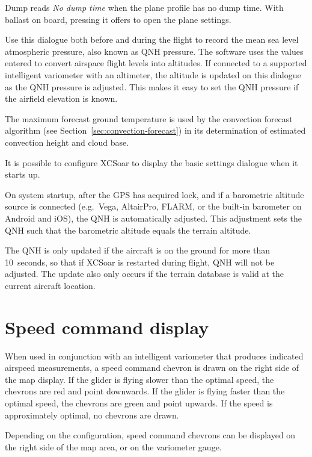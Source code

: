 Dump reads \emph{No dump time} when the plane profile has no dump
time. With ballast on board, pressing it offers to open the plane
settings.

Use this dialogue both before and during the flight to record the mean
sea level atmospheric pressure, also known as QNH pressure.  The
software uses the values entered to convert airspace flight levels
into altitudes.  If connected to a supported intelligent variometer
with an altimeter, the altitude is updated on this dialogue as the QNH
pressure is adjusted.  This makes it easy to set the QNH pressure if
the airfield elevation is known.

The maximum forecast ground temperature is used by the convection
forecast algorithm (see Section~\ref{sec:convection-forecast}) in its
determination of estimated convection height and cloud base.

\tip{} It is possible to configure XCSoar to display the basic
settings dialogue when it starts up.

On system startup, after the GPS has acquired lock, and if a
barometric altitude source is connected (e.g.\ Vega, AltairPro,
FLARM, or the built-in barometer on Android and iOS), the QNH is
automatically adjusted.  This adjustment sets the
QNH such that the barometric altitude equals the terrain altitude.

The QNH is only updated if the aircraft is on the ground for more than
10~seconds, so that if XCSoar is restarted during flight, QNH will not
be adjusted.  The update also only occurs if the terrain database is
valid at the current aircraft location.

\section{Speed command display}

When used in conjunction with an intelligent variometer that produces
indicated airspeed measurements, a speed command chevron is drawn
on the right side of the map display.  If the glider is flying slower
than the optimal speed, the chevrons are red and point downwards.  If
the glider is flying faster than the optimal speed, the chevrons are
green and point upwards.  If the speed is approximately optimal, no
chevrons are drawn.


Depending on the configuration, speed command chevrons can be
displayed on the right side of the map area, or on the variometer
gauge.


